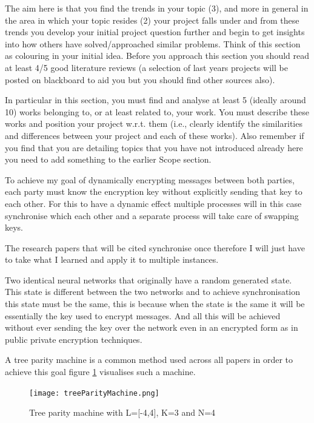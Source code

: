 The aim here is that you find the trends in your topic (3), and more in general in the area in which your topic resides (2) your project falls under and from these trends you develop your initial project question further and begin to get insights into how others have solved/approached similar problems. Think of this section as colouring in your initial idea. Before you approach this section you should read at least 4/5 good literature reviews (a selection of last years projects will be posted on blackboard to aid you but you should find other sources also).

In particular in this section, you must find and analyse at least 5 (ideally around 10) works belonging to, or at least related to, your work. You must describe these works and position your project w.r.t. them (i.e., clearly identify the similarities and differences between your project and each of these works). Also remember if you find that you are detailing topics that you have not introduced already here you need to add something to the earlier Scope section.
%
%
%
%

%
%
%
%
To achieve my goal of dynamically encrypting messages between both parties, each party must know the encryption key without explicitly sending that key to each other. For this to have a dynamic effect multiple processes will in this case synchronise which each other and a separate process will take care of swapping keys.

The research papers that will be cited synchronise once therefore I will just have to take what I learned and apply it to multiple instances.

Two identical neural networks that originally have a random generated state. This state is different between the two networks and to achieve synchronisation this state must be the same, this is because when the state is the same it will be essentially the key used to encrypt messages. And all this will be achieved without ever sending the key over the network even in an encrypted form as in public private encryption techniques. 

A tree parity machine is a common method used across all papers in order to achieve this goal figure \ref{fig:treeParityMachine} visualises such a machine.

\begin{figure}[ht]
  \centering
      \texttt{[image: treeParityMachine.png]}
  \caption[Tree parity machine]{Tree parity machine with L=[-4,4], K=3 and N=4\cite{Private_Inputs_to_Tree_Parity_Machine}}
  \label{fig:treeParityMachine}
\end{figure}

